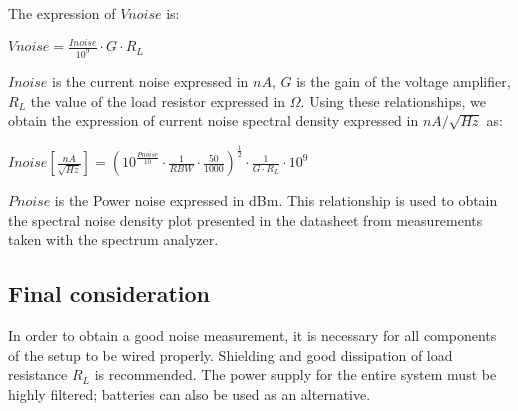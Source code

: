 The expression of $Vnoise$ is:
\newline

$Vnoise = \frac{Inoise}{10^9} \cdot G \cdot R_{L} $
\newline

$Inoise$ is the current noise expressed in $nA$, $G$ is the gain of the voltage amplifier, $R_{L}$ the value of the load resistor expressed in $\Omega$.
\newpage
Using these relationships, we obtain the expression of current noise spectral density expressed in $nA/\sqrt{Hz}$ as:
\newline

$Inoise [\frac{nA}{\sqrt{Hz}}] = (10^{\frac{Pnoise}{10}}  \cdot \frac{1}{RBW} \cdot \frac{50}{1000})^\frac{1}{2} \cdot \frac{1}{G \cdot R_{L}} \cdot 10^9$
\newline

$Pnoise$ is the Power noise expressed in dBm.\newline
This relationship is used to obtain the spectral noise density plot presented in the \QubeModel  datasheet from measurements taken with the spectrum analyzer.

\subsection{Final consideration}

In order to obtain a good noise measurement, it is necessary for all components of the setup to be wired properly.
Shielding and good dissipation of load resistance $R_{L}$ is recommended.
The power supply for the entire system must be highly filtered; batteries can also be used as an alternative.




